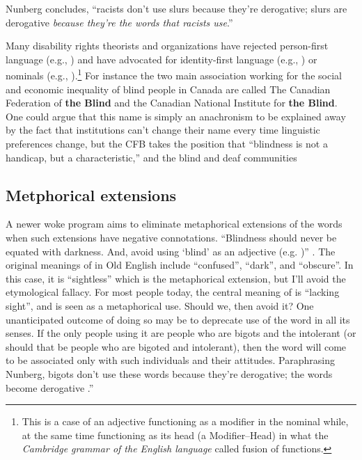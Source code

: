 Nunberg concludes, “racists don't use slurs because they're derogative; slurs are derogative \textit{because they're the words that racists use}.” \citep[244]{Nunberg2018}

Many disability rights theorists and organizations have rejected person-first language (e.g., ) and have advocated for identity-first language (e.g., ) or nominals (e.g., ).\footnote{This is a case of an adjective functioning as a modifier in the nominal while, at the same time functioning as its head (a Modifier–Head) in what the \textit{Cambridge grammar of the English language} called fusion of functions.} For instance the two main association working for the social and economic inequality of blind people in Canada are called The Canadian Federation of \textbf{the Blind} and the Canadian National Institute for \textbf{the Blind}. One could argue that this name is simply an anachronism to be explained away by the fact that institutions can't change their name every time linguistic preferences change, but the CFB takes the position that ``blindness is not a handicap, but a characteristic,'' and the blind and deaf communities

\subsection{Metphorical extensions}
A newer woke program aims to eliminate metaphorical extensions of the words when such extensions have negative connotations. ``Blindness should never be equated with darkness. And, avoid using `blind' as an adjective (e.g. )'' \citep[8]{Jones2017}. The original meanings of  in Old English include ``confused'', ``dark'', and ``obscure''. In this case, it is ``sightless'' which is the metaphorical extension, but I'll avoid the etymological fallacy. For most people today, the central meaning of  is ``lacking sight'', and  is seen as a metaphorical use. Should we, then avoid it? One unanticipated outcome of doing so may be to deprecate use of the word in all its senses. If the only people using it are people who are bigots and the intolerant (or should that be people who are bigoted and intolerant), then the word will come to be associated only with such individuals and their attitudes. Paraphrasing Nunberg, bigots don't use these words because they're derogative; the words become derogative .”


